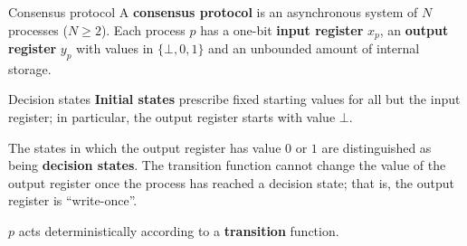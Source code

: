\documentclass[12pt]{beamer}
\begin{document}
  \begin{frame}{Consensus protocol}
    A \textbf{consensus protocol} is an asynchronous system of \(N\) processes
    (\(N\ge 2\)). Each process \(p\) has a one-bit \textbf{input register}
    \(x_p\), an \textbf{output register} \(y_p\) with values in \(\{\bot, 0,
    1\}\) and an unbounded amount of internal storage.

    \vspace{0.25cm}

    \begin{figure}
    \end{figure}
  \end{frame}

  \begin{frame}{Decision states}
    \textbf{Initial states} prescribe fixed starting values for all but the
    input register; in particular, the output register starts with value
    \(\bot\).

    \vspace{0.25cm}

    The states in which the output register has value \(0\) or \(1\) are
    distinguished as being \textbf{decision states}. The transition function
    cannot change the value of the output register once the process has reached
    a decision state; that is, the output register is ``write-once''.

    \vspace{0.25cm}

    \(p\) acts deterministically according to a \textbf{transition} function.
  \end{frame}
\end{document}
